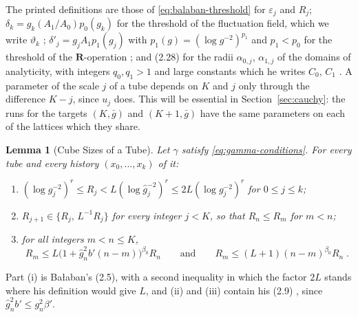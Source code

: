 \documentclass[11pt]{preprint}
\numberwithin{equation}{section}
\newtheorem{lemma}[theorem]{Lemma}
\theoremstyle{definition}
\theoremstyle{remark}
\theoremstyle{plain}
\begin{document}
The printed definitions are those of \eqref{eq:balaban-threshold} for $\varepsilon_j$ and $R_j$; $\delta_k = g_k(A_1/A_0)p_0(g_k)$ for the threshold of the fluctuation field, which we write $\vartheta_k$ \cite[p.~265, after (3.4)]{BalabanCRE}; $\delta'_j = g_jA_1p_1(g_j)$ with $p_1(g) = (\log g^{-2})^{p_1}$ and $p_1 < p_0$ for the threshold of the $\mathbf R$-operation \cite[p.~183]{BalabanLFR1}; and (2.28) for the radii $\alpha_{0,j}$, $\alpha_{1,j}$ of the domains of analyticity, with integers $q_0, q_1 > 1$ and large constants which he writes $C_0$, $C_1$ \cite[p.~259]{BalabanCRE}. A parameter of the scale $j$ of a tube depends on $K$ and $j$ only through the difference $K - j$, since $u_j$ does. This will be essential in Section~\ref{sec:cauchy}: the runs for the targets $(K, \bar g)$ and $(K + 1, \bar g)$ have the same parameters on each of the lattices which they share.

\begin{lemma}[Cube Sizes of a Tube]\label{lem:tube-cubes}
Let $\gamma$ satisfy \eqref{eq:gamma-conditions}. For every tube and every history $(x_0, \dots, x_k)$ of it:
\begin{enumerate}[label=(\roman*)]
\item $(\log g_j^{-2})^r \leq R_j < L(\log\hat g_j^{-2})^r \leq 2L(\log g_j^{-2})^r$ for $0 \leq j \leq k$;
\item $R_{j+1} \in \{ R_j,\, L^{-1}R_j \}$ for every integer $j < K$, so that $R_n \leq R_m$ for $m < n$;
\item for all integers $m < n \leq K$,
\begin{equation}\label{eq:tube-two-nine}
    R_m \leq L\bigl(1 + \hat g_n^2b'(n - m)\bigr)^{\beta_0}R_n
    \qquad\text{and}\qquad
    R_m \leq (L + 1)(n - m)^{\beta_0}R_n\;.
\end{equation}
\end{enumerate}
\end{lemma}

Part (i) is Ba{\l}aban's (2.5), with a second inequality in which the factor $2L$ stands where his definition would give $L$, and (ii) and (iii) contain his (2.9) \cite[pp.~255--256]{BalabanCRE}, since $\hat g_n^2b' \leq g_n^2\beta'$.
\end{document}
